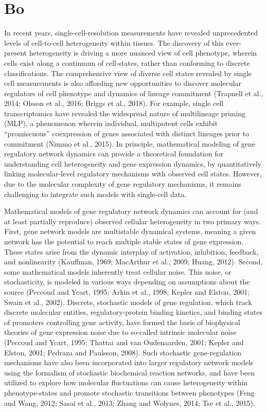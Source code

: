 \section{Bo}
In recent years, single-cell-resolution measurements have revealed unprecedented levels of cell-to-cell heterogeneity within tissues. The discovery of this ever-present heterogeneity is driving a more nuanced view of cell phenotype, wherein cells exist along a continuum of cell-states, rather than conforming to discrete classifications. The comprehensive view of diverse cell states revealed by single cell measurements is also affording new opportunities to discover molecular regulators of cell phenotype and dynamics of lineage commitment (Trapnell et al., 2014; Olsson et al., 2016; Briggs et al., 2018). For example, single cell transcriptomics have revealed the widespread nature of multilineage priming (MLP), a phenomenon wherein individual, multipotent cells exhibit “promiscuous” coexpression of genes associated with distinct lineages prior to commitment (Nimmo et al., 2015). In principle, mathematical modeling of gene regulatory network dynamics can provide a theoretical foundation for understanding cell heterogeneity and gene expression dynamics, by quantitatively linking molecular-level regulatory mechanisms with observed cell states. However, due to the molecular complexity of gene regulatory mechanisms, it remains challenging to integrate such models with single-cell data.

Mathematical models of gene regulatory network dynamics can account for (and at least partially reproduce) observed cellular heterogeneity in two primary ways. First, gene network models are multistable dynamical systems, meaning a given network has the potential to reach multiple stable states of gene expression. These states arise from the dynamic interplay of activation, inhibition, feedback, and nonlinearity (Kauffman, 1969; MacArthur et al., 2009; Huang, 2012). Second, some mathematical models inherently treat cellular noise. This noise, or stochasticity, is modeled in various ways depending on assumptions about the source (Peccoud and Ycart, 1995; Arkin et al., 1998; Kepler and Elston, 2001; Swain et al., 2002). Discrete, stochastic models of gene regulation, which track discrete molecular entities, regulatory-protein binding kinetics, and binding states of promoters controlling gene activity, have formed the basis of biophysical theories of gene expression noise due to so-called intrinsic molecular noise (Peccoud and Ycart, 1995; Thattai and van Oudenaarden, 2001; Kepler and Elston, 2001; Pedraza and Paulsson, 2008). Such stochastic gene-regulation mechanisms have also been incorporated into larger regulatory network models using the formalism of stochastic biochemical reaction networks, and have been utilized to explore how molecular fluctuations can cause heterogeneity within phenotype-states and promote stochastic transitions between phenotypes (Feng and Wang, 2012; Sasai et al., 2013; Zhang and Wolynes, 2014; Tse et al., 2015).

